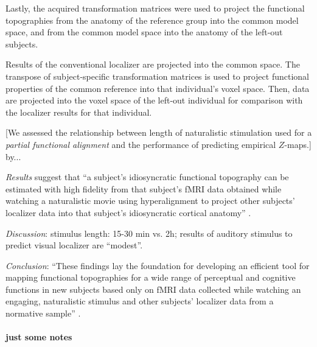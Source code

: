 Lastly, the acquired transformation matrices were used to project the functional
topographies from the anatomy of the reference group into the common model
space, and from the common model space into the anatomy of the left-out
subjects.

%
Results of the conventional localizer are projected into the common space.
%
The transpose of subject-specific transformation matrices is used to project
functional properties of the common reference into that individual's voxel
space.
%
Then, data are projected into the voxel space of the left-out individual for
comparison with the localizer results for that individual.


[We assessed the relationship between length of naturalistic stimulation used
for a \textit{partial functional alignment} and the performance of predicting
empirical $Z$-maps.] by...

%
\textit{Results} suggest that ``a subject's idiosyncratic functional topography
can be estimated with high fidelity from that subject's fMRI data obtained while
watching a naturalistic movie using hyperalignment to project other subjects’
localizer data into that subject's idiosyncratic cortical anatomy''
\citep{jiahui2020predicting}.

%
\textit{Discussion}: stimulus length: 15-30 min vs. 2h;  results of auditory
stimulus to predict visual localizer are ``modest''.

%
\textit{Conclusion}: ``These findings lay the foundation for developing an
efficient tool for mapping functional topographies for a wide range of
perceptual and cognitive functions in new subjects based only on fMRI data
collected while watching an engaging, naturalistic stimulus and other subjects'
localizer data from a normative sample'' \citep{jiahui2020predicting}.


\paragraph{just some notes}

